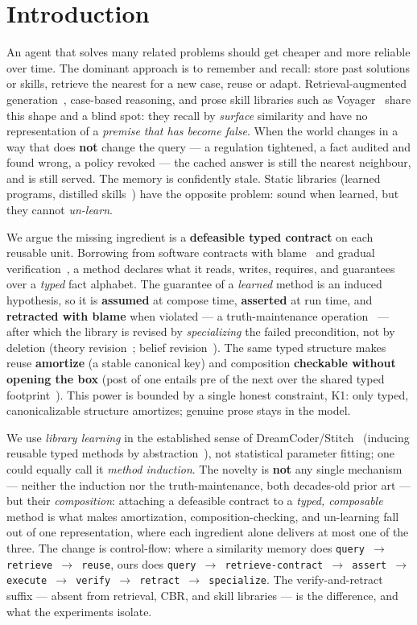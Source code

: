 \documentclass[11pt]{article}
\newcommand{\K}{\textsf{K1}}
\begin{document}
\section{Introduction}
An agent that solves many related problems should get cheaper and more reliable over time. The dominant approach is
to remember and recall: store past solutions or skills, retrieve the nearest for a new case, reuse or adapt.
Retrieval-augmented generation~\cite{lewis2020}, case-based reasoning, and prose skill libraries such as
Voyager~\cite{wang2023} share this shape and a blind spot: they recall by \emph{surface} similarity and have no
representation of a \emph{premise that has become false}. When the world changes in a way that does \textbf{not}
change the query --- a regulation tightened, a fact audited and found wrong, a policy revoked --- the cached answer
is still the nearest neighbour, and is still served. The memory is confidently stale. Static libraries (learned
programs, distilled skills~\cite{ellis2021,bowers2023}) have the opposite problem: sound when learned, but they
cannot \emph{un-learn}.

We argue the missing ingredient is a \textbf{defeasible typed contract} on each reusable unit. Borrowing from
software contracts with blame~\cite{findler2002} and gradual verification~\cite{bader2018}, a method declares what
it reads, writes, requires, and guarantees over a \emph{typed} fact alphabet. The guarantee of a \emph{learned}
method is an induced hypothesis, so it is \textbf{assumed} at compose time, \textbf{asserted} at run time, and
\textbf{retracted with blame} when violated --- a truth-maintenance operation~\cite{doyle1979,dekleer1986} --- after
which the library is revised by \emph{specializing} the failed precondition, not by deletion (theory
revision~\cite{ourston1994,richards1995}; belief revision~\cite{agm1985}). The same typed structure makes reuse
\textbf{amortize} (a stable canonical key) and composition \textbf{checkable without opening the box} (post of one
entails pre of the next over the shared typed footprint~\cite{ohearn2001,reynolds2002}). This power is bounded by a
single honest constraint, \K{}: only typed, canonicalizable structure amortizes; genuine prose stays in the model.

We use \emph{library learning} in the established sense of DreamCoder/Stitch~\cite{ellis2021,bowers2023} (inducing
reusable typed methods by abstraction~\cite{plotkin1970}), not statistical parameter fitting; one could equally call
it \emph{method induction}. The novelty is \textbf{not} any single mechanism --- neither the induction nor the
truth-maintenance, both decades-old prior art --- but their \emph{composition}: attaching a defeasible contract to a
\emph{typed, composable} method is what makes amortization, composition-checking, and un-learning fall out of one
representation, where each ingredient alone delivers at most one of the three. The change is control-flow: where a similarity memory does
\texttt{query $\to$ retrieve $\to$ reuse}, ours does
\texttt{query $\to$ retrieve-contract $\to$ assert $\to$ execute $\to$ verify $\to$ retract $\to$ specialize}. The
verify-and-retract suffix --- absent from retrieval, CBR, and skill libraries --- is the difference, and what the
experiments isolate.
\end{document}
